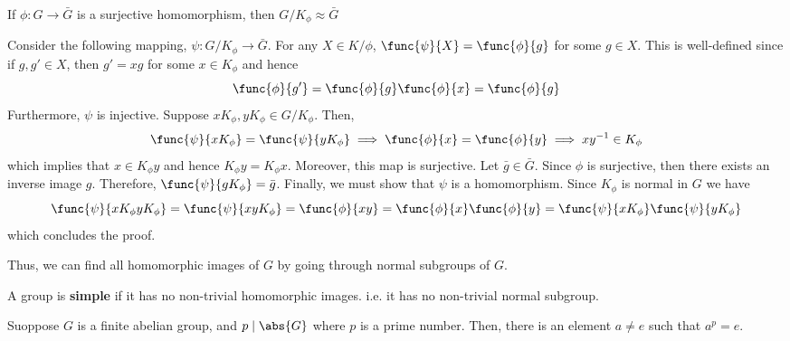 \begin{theorem}\label{thm:surjectiveHomomorphism}
    If \(\phi: G \to \bar{G}\) is a surjective homomorphism, then \(G/K_{\phi} \approx \bar{G}\)
\end{theorem}

\begin{prooflemma}
    Consider the following mapping, \(\psi: G/K_{\phi} \to \bar{G}\). For any \(X \in K/\phi\), \(\func{\psi}{X} = \func{\phi}{g}\) for some \(g \in X\). This is well-defined since if \(g,g' \in X\), then \(g' = xg\) for some \(x \in K_{\phi}\) and hence 
    \begin{equation*}
        \func{\phi}{g'} = \func{\phi}{g} \func{\phi}{x} = \func{\phi}{g}
    \end{equation*}
    Furthermore, \(\psi\) is injective. Suppose \(xK_{\phi},yK_{\phi} \in G/K_{\phi}\). Then,
    \begin{equation*}
        \func{\psi}{xK_{\phi}} = \func{\psi}{yK_{\phi}} \implies \func{\phi}{x} = \func{\phi}{y} \implies xy^{-1} \in K_{\phi}
    \end{equation*}
    which implies that \(x \in K_{\phi} y\) and hence \(K_{\phi} y = K_{\phi} x\). Moreover, this map is surjective. Let \(\bar{g} \in \bar{G}\). Since \(\phi\) is surjective, then there exists an inverse image \(g\). Therefore, \(\func{\psi}{gK_{\phi}} = \bar{g}\). Finally, we must show that \(\psi\) is a homomorphism. Since \(K_{\phi}\) is normal in \(G\) we have 
    \begin{equation*}
        \func{\psi}{xK_{\phi} y K_{\phi}} = \func{\psi}{xy K_{\phi}}= \func{\phi}{xy} = \func{\phi}{x}\func{\phi}{y} = \func{\psi}{xK_{\phi}} \func{\psi}{yK_{\phi}}
    \end{equation*}
    which concludes the proof.
\end{prooflemma}

Thus, we can find all homomorphic images of \(G\) by going through normal subgroups of \(G\).

\begin{definition}
    A group is \textbf{simple} if it has no non-trivial homomorphic images. i.e. it has no non-trivial normal subgroup.
\end{definition}

\begin{theorem}\label{thm:CauchyForAbelian}
    Suoppose \(G\) is a finite abelian group, and \(p \mid \abs{G}\) where \(p\) is a prime number. Then, there is an element \(a \neq e\) such that \(a^p = e\).
\end{theorem}

